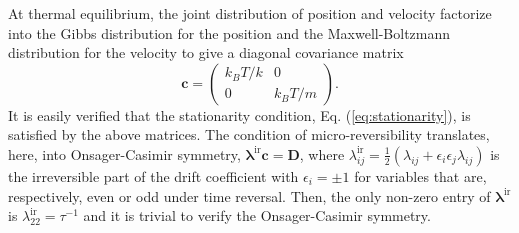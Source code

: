 \documentclass[english,aps, twocolumn, pre,superscriptaddress, notitlepage]{revtex4-1}
\begin{document}
At thermal equilibrium, the joint distribution of position and velocity
factorize into the Gibbs distribution for the position and the Maxwell-Boltzmann
distribution for the velocity to give a diagonal covariance matrix
\begin{equation}
\bm{c}=\begin{pmatrix}k_{B}T/k & 0\\
0 & k_{B}T/m
\end{pmatrix}.\label{eq:covarianceDiagonal}
\end{equation}
It is easily verified that the stationarity condition, Eq. (\ref{eq:stationarity}),
is satisfied by the above matrices. The condition of micro-reversibility
translates, here, into Onsager-Casimir symmetry, $\boldsymbol{\lambda}^{\mathrm{ir}}\boldsymbol{c}=\boldsymbol{D}$,
where $\lambda_{ij}^{\mathrm{ir}}=\frac{1}{2}(\lambda_{ij}+\epsilon_{i}\epsilon_{j}\lambda_{ij})$
is the irreversible part of the drift coefficient with $\epsilon_{i}=\pm1$
for variables that are, respectively, even or odd under time reversal.
Then, the only non-zero entry of $\boldsymbol{\lambda}^{\mathrm{ir}}$
is $\lambda_{22}^{\mathrm{ir}}=\tau^{-1}$ and it is trivial to verify
the Onsager-Casimir symmetry.
\end{document}

